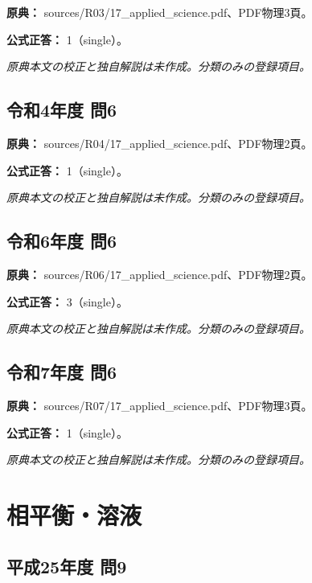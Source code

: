 \noindent\textbf{原典：} sources/R03/17\_applied\_science.pdf、PDF物理3頁。

\textbf{公式正答：} 1（single）。

\par\textit{原典本文の校正と独自解説は未作成。分類のみの登録項目。}

\subsection{令和4年度 問6}
\label{q:r04-reg-applied-06}

\noindent\textbf{原典：} sources/R04/17\_applied\_science.pdf、PDF物理2頁。

\textbf{公式正答：} 1（single）。

\par\textit{原典本文の校正と独自解説は未作成。分類のみの登録項目。}

\subsection{令和6年度 問6}
\label{q:r06-reg-applied-06}

\noindent\textbf{原典：} sources/R06/17\_applied\_science.pdf、PDF物理2頁。

\textbf{公式正答：} 3（single）。

\par\textit{原典本文の校正と独自解説は未作成。分類のみの登録項目。}

\subsection{令和7年度 問6}
\label{q:r07-reg-applied-06}

\noindent\textbf{原典：} sources/R07/17\_applied\_science.pdf、PDF物理3頁。

\textbf{公式正答：} 1（single）。

\par\textit{原典本文の校正と独自解説は未作成。分類のみの登録項目。}

\section{相平衡・溶液}

\subsection{平成25年度 問9}
\label{q:h25-reg-applied-09}

